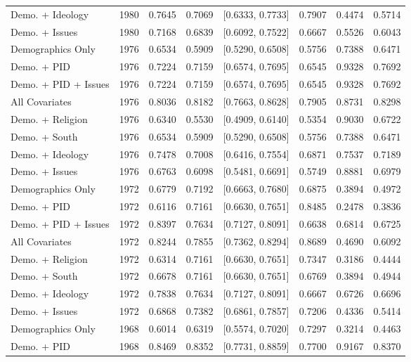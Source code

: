\begin{longtable}{lrrrlrrr}
  Demo. + Ideology & 1980 & 0.7645 & 0.7069 & [0.6333, 0.7733] & 0.7907 & 0.4474 & 0.5714 \\ 
  Demo. + Issues & 1980 & 0.7168 & 0.6839 & [0.6092, 0.7522] & 0.6667 & 0.5526 & 0.6043 \\ 
  Demographics Only & 1976 & 0.6534 & 0.5909 & [0.5290, 0.6508] & 0.5756 & 0.7388 & 0.6471 \\ 
  Demo. + PID & 1976 & 0.7224 & 0.7159 & [0.6574, 0.7695] & 0.6545 & 0.9328 & 0.7692 \\ 
  Demo. + PID + Issues & 1976 & 0.7224 & 0.7159 & [0.6574, 0.7695] & 0.6545 & 0.9328 & 0.7692 \\ 
  All Covariates & 1976 & 0.8036 & 0.8182 & [0.7663, 0.8628] & 0.7905 & 0.8731 & 0.8298 \\ 
  Demo. + Religion & 1976 & 0.6340 & 0.5530 & [0.4909, 0.6140] & 0.5354 & 0.9030 & 0.6722 \\ 
  Demo. + South & 1976 & 0.6534 & 0.5909 & [0.5290, 0.6508] & 0.5756 & 0.7388 & 0.6471 \\ 
  Demo. + Ideology & 1976 & 0.7478 & 0.7008 & [0.6416, 0.7554] & 0.6871 & 0.7537 & 0.7189 \\ 
  Demo. + Issues & 1976 & 0.6763 & 0.6098 & [0.5481, 0.6691] & 0.5749 & 0.8881 & 0.6979 \\ 
  Demographics Only & 1972 & 0.6779 & 0.7192 & [0.6663, 0.7680] & 0.6875 & 0.3894 & 0.4972 \\ 
  Demo. + PID & 1972 & 0.6116 & 0.7161 & [0.6630, 0.7651] & 0.8485 & 0.2478 & 0.3836 \\ 
  Demo. + PID + Issues & 1972 & 0.8397 & 0.7634 & [0.7127, 0.8091] & 0.6638 & 0.6814 & 0.6725 \\ 
  All Covariates & 1972 & 0.8244 & 0.7855 & [0.7362, 0.8294] & 0.8689 & 0.4690 & 0.6092 \\ 
  Demo. + Religion & 1972 & 0.6314 & 0.7161 & [0.6630, 0.7651] & 0.7347 & 0.3186 & 0.4444 \\ 
  Demo. + South & 1972 & 0.6678 & 0.7161 & [0.6630, 0.7651] & 0.6769 & 0.3894 & 0.4944 \\ 
  Demo. + Ideology & 1972 & 0.7838 & 0.7634 & [0.7127, 0.8091] & 0.6667 & 0.6726 & 0.6696 \\ 
  Demo. + Issues & 1972 & 0.6868 & 0.7382 & [0.6861, 0.7857] & 0.7206 & 0.4336 & 0.5414 \\ 
  Demographics Only & 1968 & 0.6014 & 0.6319 & [0.5574, 0.7020] & 0.7297 & 0.3214 & 0.4463 \\ 
  Demo. + PID & 1968 & 0.8469 & 0.8352 & [0.7731, 0.8859] & 0.7700 & 0.9167 & 0.8370 \\ 

\end{longtable}
